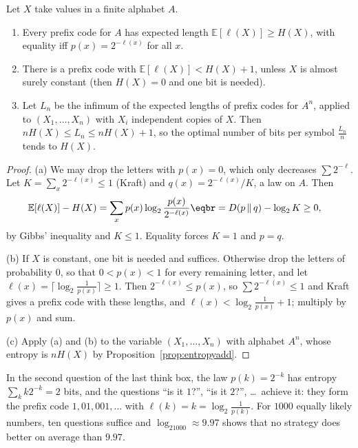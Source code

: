 \begin{theorem}\label{thm:sourcecoding}
Let $X$ take values in a finite alphabet $A$.
\begin{enumerate}[label=(\alph*)]
\item Every prefix code for $A$ has expected length $\mathbb E[\ell(X)]\ge H(X)$, with equality iff $p(x)=2^{-\ell(x)}$ for all $x$.
\item There is a prefix code with $\mathbb E[\ell(X)]<H(X)+1$, unless $X$ is almost surely constant (then $H(X)=0$ and one bit is
needed).
\item Let $L_n$ be the infimum of the expected lengths of prefix codes for $A^n$, applied to $(X_1,\dots,X_n)$ with $X_i$ independent
copies of $X$. Then $nH(X)\le L_n\le nH(X)+1$, so the optimal number of bits per symbol $\frac{L_n}n$ tends to $H(X)$.
\end{enumerate}
\end{theorem}
\begin{proof}
(a) We may drop the letters with $p(x)=0$, which only decreases $\sum2^{-\ell}$. Let $K=\sum_x2^{-\ell(x)}\le1$ (Kraft) and $q(x)=2^{-\ell(x)}/K$, a law on $A$.
Then
\[
\begin{aligned}\mathbb E[\ell(X)]-H(X)&=\sum_xp(x)\log_2\frac{p(x)}{2^{-\ell(x)}}\eqbr=D(p\,\|\,q)-\log_2K\ge0,\end{aligned}
\]
by Gibbs' inequality and $K\le1$. Equality forces $K=1$ and $p=q$.

(b) If $X$ is constant, one bit is needed and suffices. Otherwise drop the letters of probability $0$, so that $0<p(x)<1$ for every
remaining letter, and let $\ell(x)=\lceil\log_2\frac1{p(x)}\rceil\ge1$. Then $2^{-\ell(x)}\le p(x)$, so $\sum2^{-\ell(x)}\le1$ and Kraft gives a prefix code
with these lengths, and $\ell(x)<\log_2\frac1{p(x)}+1$; multiply by $p(x)$ and sum.

(c) Apply (a) and (b) to the variable $(X_1,\dots,X_n)$ with alphabet $A^n$, whose entropy is $nH(X)$ by Proposition~\ref{prop:entropyadd}.
\end{proof}

In the second question of the last think box, the law $p(k)=2^{-k}$ has entropy $\sum_kk2^{-k}=2$ bits, and the questions
``is it $1$?'', ``is it $2$?'', \ldots\ achieve it: they form the prefix code $1,01,001,\ldots$ with $\ell(k)=k=\log_2\frac1{p(k)}$. For $1000$ equally likely
numbers, ten questions suffice and $\log_21000\approx9.97$ shows that no strategy does better on average than $9.97$.

